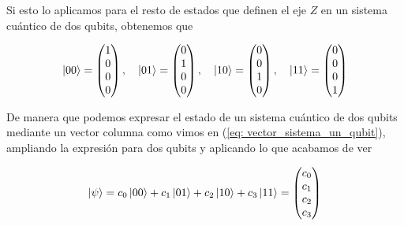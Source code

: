 \documentclass[12pt]{article}
\numberwithin{equation}{section} %
\begin{document}
    \vspace{2.5mm}

    Si esto lo aplicamos para el resto de estados que definen el eje \( Z \) en un sistema cuántico de dos qubits, obtenemos que

    \begin{equation}
        \ket{0 0} = \begin{pmatrix}
            1 \\
            0 \\
            0 \\
            0 
        \end{pmatrix}, \quad \ket{0 1} = \begin{pmatrix}
            0 \\
            1 \\
            0 \\
            0 
        \end{pmatrix}, \quad \ket{1 0} = \begin{pmatrix}
            0 \\
            0 \\
            1 \\
            0 
        \end{pmatrix}, \quad \ket{1 1} = \begin{pmatrix}
            0 \\
            0 \\
            0 \\
            1 
        \end{pmatrix}
        \label{eq: estados_matricial_2_qubits}
    \end{equation}

    \vspace{2.5mm}

    De manera que podemos expresar el estado de un sistema cuántico de dos qubits mediante un vector columna como vimos en (\ref{eq: vector_sistema_un_qubit}), ampliando la expresión para dos qubits y aplicando lo que acabamos de ver

    \begin{equation}
        \ket{\psi} = c_{0} \ket{0 0} + c_{1} \ket{0 1} + c_{2} \ket{1 0} + c_{3} \ket{1 1} = \begin{pmatrix}
            c_{0} \\
            c_{1} \\
            c_{2} \\
            c_{3}
        \end{pmatrix}
        \label{eq: estado_qubit_dimension_2_matriz}
    \end{equation}
\end{document}
